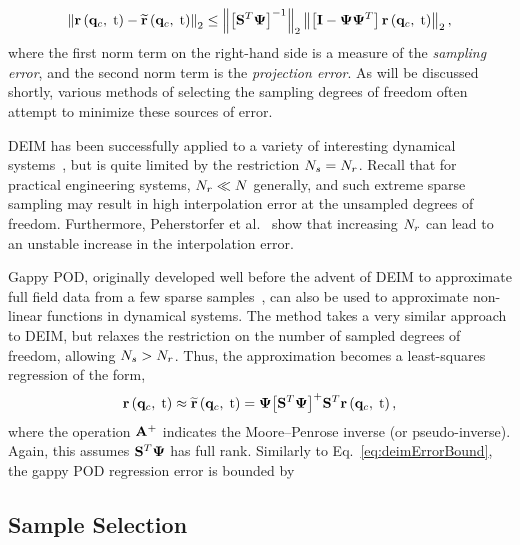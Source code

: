 \begin{equation}\label{eq:deimErrorBound}
   \left\Vert \resFunc{\consVec, \; \timeVar} - \resApproxFunc{\consVec, \; \timeVar} \right\Vert_2 \le \left\Vert \left[ \sampMat^T \deimBasis \right]^{-1} \right\Vert_2 \left\Vert \left[ \identMat - \deimBasis \deimBasis^T \right] \resFunc{\consVec, \; \timeVar} \right\Vert_2,
\end{equation}
where the first norm term on the right-hand side is a measure of the \textit{sampling error}, and the second norm term is the \textit{projection error}. As will be discussed shortly, various methods of selecting the sampling degrees of freedom often attempt to minimize these sources of error.

DEIM has been successfully applied to a variety of interesting dynamical systems~\cite{Chaturantabut2011, Henneron2014}, but is quite limited by the restriction $N_s = N_r$. Recall that for practical engineering systems, $N_r \ll N$ generally, and such extreme sparse sampling may result in high interpolation error at the unsampled degrees of freedom. Furthermore, Peherstorfer et al.~\cite{Peherstorfer2020} show that increasing $N_r$ can lead to an unstable increase in the interpolation error.

Gappy POD, originally developed well before the advent of DEIM to approximate full field data from a few sparse samples~\cite{Everson1995}, can also be used to approximate non-linear functions in dynamical systems. The method takes a very similar approach to DEIM, but relaxes the restriction on the number of sampled degrees of freedom, allowing $N_s > N_r$. Thus, the approximation becomes a least-squares regression of the form,
\begin{equation}\label{eq:gappyPODRHSApprox}
    \resFunc{\consVec, \; \timeVar} \approx \resApproxFunc{\consVec, \; \timeVar} = \deimBasis \big[ \sampMat^T \deimBasis \big]^{+} \sampMat^T \resFunc{\consVec, \; \timeVar},
\end{equation}
where the operation $\mathbf{A}^+$ indicates the Moore--Penrose inverse (or pseudo-inverse). Again, this assumes $\sampMat^T \deimBasis$ has full rank. Similarly to Eq.~\ref{eq:deimErrorBound}, the gappy POD regression error is bounded by


\subsection{Sample Selection}